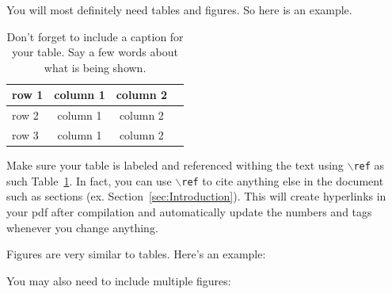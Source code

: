\documentclass[11pt]{amsart}
\begin{document}
You will most definitely need tables and figures. So here is an example. 

\begin{table}[htp]
    \centering
    \begin{tabular}{| l | c|c | r |}
         \hline
         row 1 & column 1  & column 2  \\ \hline
         row 2 & column 1 & column 2 \\ 
         row 3 & column 1 & column 2 \\ \hline
    \end{tabular}
    \caption{Don't forget to include a caption for your table. Say a few words about what is 
    being shown.}
    \label{tab:meaningful-label}
\end{table}

Make sure your table is labeled and referenced withing the text using $\backslash$\texttt{ref} as such Table~\ref{tab:meaningful-label}. In fact, you can 
use $\backslash$\texttt{ref} to cite anything else in the document such as 
sections (ex. Section~\ref{sec:Introduction}). This will create hyperlinks in your 
pdf after compilation and automatically update the numbers and tags whenever you change 
anything. 

Figures are very similar to tables. Here's an example: 


You may also need to include multiple figures: 

\end{document}
